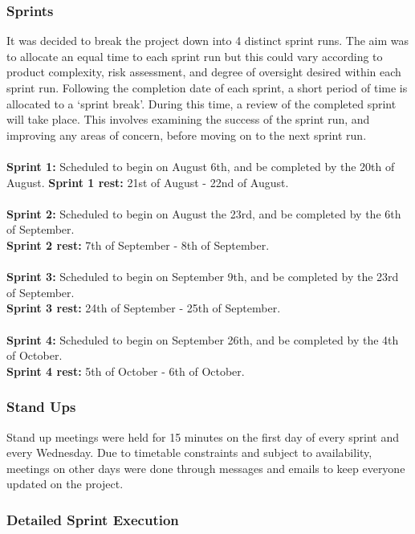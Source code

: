 \documentclass[paper=a4, fontsize=11pt]{scrartcl}
\numberwithin{equation}{section}		%
\numberwithin{figure}{section}			%
\numberwithin{table}{section}				%
\begin{document}
\subsubsection{Sprints}
It was decided to break the project down into 4 distinct sprint runs. The aim was to allocate an equal time to each sprint run but this could vary according to product complexity, risk assessment, and degree of oversight desired within each sprint run.
Following the completion date of each sprint, a short period of time is allocated to a ‘sprint break’. During this time, a review of the completed sprint will take place. This involves examining the success of the sprint run, and improving any areas of concern, before moving on to the next sprint run.\\\\\textbf{Sprint 1:} Scheduled to begin on August 6th, and be completed by the 20th of August.
\textbf{Sprint 1 rest:} 21st of August - 22nd of August.\\\\\textbf{Sprint 2:} Scheduled to begin on August the 23rd, and be completed by the 6th of September.\\
\textbf{Sprint 2 rest:} 7th of September - 8th of September.\\\\\textbf{Sprint 3:} Scheduled to begin on September 9th, and be completed by the 23rd of September.\\
\textbf{Sprint 3 rest:} 24th of September - 25th of September.\\\\\textbf{Sprint 4:} Scheduled to begin on September 26th, and be completed by the 4th of October.\\
\textbf{Sprint 4 rest:} 5th of October - 6th of October.


\subsubsection{Stand Ups}
Stand up meetings were held for 15 minutes on the first day of every sprint and every Wednesday. Due to timetable constraints and subject to availability, meetings on other days were done through messages and emails to keep everyone updated on the project.


\subsubsection{Detailed Sprint Execution}
\end{document}
